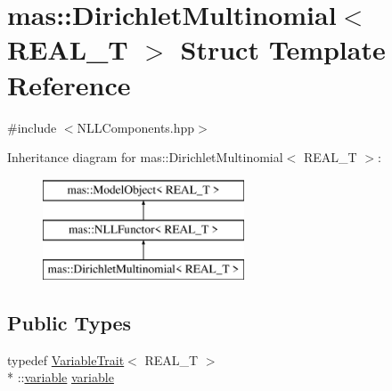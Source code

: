 \hypertarget{structmas_1_1_dirichlet_multinomial}{\section{mas\-:\-:Dirichlet\-Multinomial$<$ R\-E\-A\-L\-\_\-\-T $>$ Struct Template Reference}
\label{structmas_1_1_dirichlet_multinomial}
}


{\ttfamily \#include $<$N\-L\-L\-Components.\-hpp$>$}

Inheritance diagram for mas\-:\-:Dirichlet\-Multinomial$<$ R\-E\-A\-L\-\_\-\-T $>$\-:\begin{figure}[H]
\begin{center}
\leavevmode
\includegraphics[height=3.000000cm]{structmas_1_1_dirichlet_multinomial}
\end{center}
\end{figure}
\subsection*{Public Types}
\begin{DoxyCompactItemize}
\item 
typedef \hyperlink{structmas_1_1_variable_trait}{Variable\-Trait}$<$ R\-E\-A\-L\-\_\-\-T $>$\\*
\-::\hyperlink{structmas_1_1_dirichlet_multinomial_a8e6915521c8c414ac50b545e6b77c4dd}{variable} \hyperlink{structmas_1_1_dirichlet_multinomial_a8e6915521c8c414ac50b545e6b77c4dd}{variable}
\end{DoxyCompactItemize}
